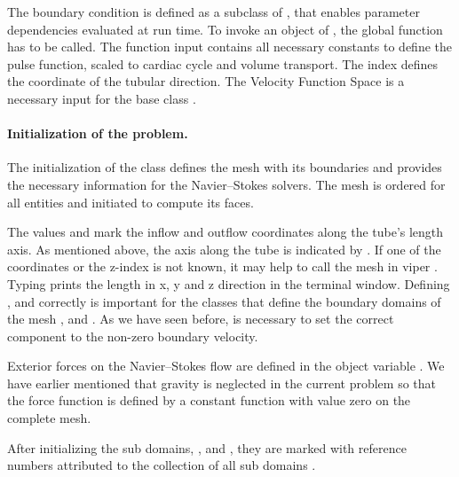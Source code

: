 The boundary condition  is defined as a subclass of
, that enables parameter dependencies evaluated at run
time. To invoke an object of , the global function
 has to be called. The function input
contains all necessary constants to define the pulse function, scaled
to cardiac cycle and volume transport. The index 
defines the coordinate of the tubular direction. The Velocity Function
Space  is a necessary input for the base class .

\paragraph{Initialization of the problem.} The initialization of the class  defines the mesh with its boundaries and provides the necessary information for the Navier--Stokes solvers. The mesh is ordered for all entities and initiated to compute its faces.

The values  and  mark the inflow and outflow
coordinates along the tube's length axis. As mentioned above, the axis
along the tube is indicated by . If one of the
coordinates or the z-index is not known, it may help to call the mesh
in viper . Typing  prints the
length in x, y and z direction in the terminal window. Defining
,  and  correctly is important
for the classes that define the boundary domains of the mesh
,  and . As we have seen before,
 is necessary to set the correct component to the
non-zero boundary velocity.

Exterior forces on the Navier--Stokes flow are defined in the object variable . We have earlier mentioned that gravity is neglected in the current problem so that the force function  is defined by a constant function  with value zero on the complete mesh.

After initializing the sub domains, ,  and , they are marked with reference numbers attributed to the collection of all sub domains . 

